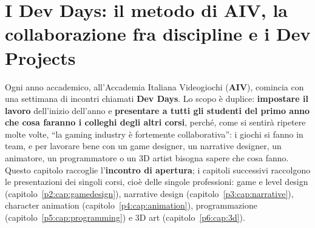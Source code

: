 %

\chapter[I Dev Days e il metodo di AIV]{I Dev Days: il metodo di AIV,
la collaborazione fra discipline e i Dev Projects}
\label{p1:cap:devdays}

Ogni anno accademico, all'Accademia Italiana Videogiochi (\textbf{AIV}),
comincia con una settimana di incontri chiamati \textbf{Dev Days}. Lo scopo
è duplice: \textbf{impostare il lavoro} dell'inizio dell'anno e
\textbf{presentare a tutti gli studenti del primo anno che cosa faranno i
colleghi degli altri corsi}, perché, come si sentirà ripetere molte volte,
``la gaming industry è fortemente collaborativa'': i giochi si fanno in team,
e per lavorare bene con un game designer, un narrative designer, un
animatore, un programmatore o un 3D artist bisogna sapere che cosa fanno.
Questo capitolo raccoglie l'\textbf{incontro di apertura}; i capitoli
successivi raccolgono le presentazioni dei singoli corsi, cioè delle singole
professioni: game e level design (capitolo~\ref{p2:cap:gamedesign}),
narrative design (capitolo~\ref{p3:cap:narrative}), character animation
(capitolo~\ref{p4:cap:animation}), programmazione
(capitolo~\ref{p5:cap:programming}) e 3D art (capitolo~\ref{p6:cap:3d}).

